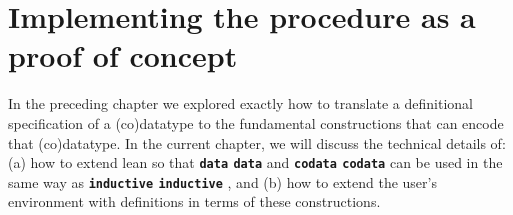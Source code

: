 \documentclass[titlepage]{report}
\newcommand\lean[1]{%
\ifx\leanmode\undefined%
\def\leanmode{1}%
\texttt{\small #1}%
\undef\leanmode%
\else%
\texttt{#1}%
\fi%
}
\newcommand\keyword[1]{{\color{keywordcolor} \textbf{\lean{#1}}}}
\newcommand\inductive{{\keyword{inductive}}}
\newcommand\data{\keyword{data}}
\newcommand\codata{\keyword{codata}}
\begin{document}



























\chapter{Implementing the procedure as a proof of concept}
\label{ch:implementing}


In the preceding chapter we explored exactly how to translate a definitional specification of a (co)datatype to the fundamental constructions that can encode that (co)datatype.
In the current chapter, we will discuss the technical details of: (a) how to extend lean so that \data and \codata can be used in the same way as \inductive, and (b) how to extend the user's environment with definitions in terms of these constructions.
\end{document}
